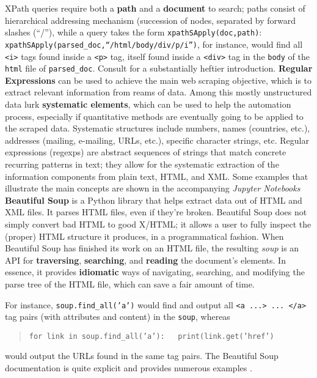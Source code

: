 XPath queries require both a \textbf{path} and a \textbf{document} to search; paths consist of hierarchical addressing mechanism (succession of nodes, separated by forward slashes (``/''), while a query takes the form \small\texttt{xpathSApply(doc,path)}\normalsize :\\
\footnotesize\texttt{xpathSApply(parsed\_doc,``/html/body/div/p/i'')}\normalsize, for instance, would find all \texttt{<i>} tags found inside a \texttt{<p>} tag, itself found inside a \texttt{<div>} tag in the \texttt{body} of the \texttt{html} file of \texttt{parsed\_doc}. Consult \cite{DC_MRMN} for a substantially heftier introduction. 
\newl\textbf{Regular Expressions} can be used to achieve the main web scraping objective, which is to extract  relevant information from reams of data. Among this mostly unstructured data lurk \textbf{systematic elements}, which can be used to help the automation process, especially if quantitative methods are eventually going to be applied to the scraped data. Systematic structures include numbers, names (countries, etc.), addresses (mailing, e-mailing, URLs, etc.), specific character strings, etc. Regular expressions (regexps) are abstract sequences of strings that match concrete recurring patterns in text; they allow for the systematic extraction of the information components from plain text, HTML, and XML. Some examples that illustrate the main concepts are shown in the accompanying \textit{Jupyter Notebooks} %
\newl\textbf{Beautiful Soup} is a Python library that helps extract data out of HTML and XML files. It parses HTML files, even if they're broken. Beautiful Soup does not simply convert bad HTML to good X/HTML; it allows a user to fully inspect the (proper) HTML structure it produces, in a programmatical fashion. When Beautiful Soup has finished its work on an HTML file, the resulting \textit{soup} is an API for \textbf{traversing}, \textbf{searching}, and \textbf{reading} the document's elements. In essence, it provides \textbf{idiomatic} ways of navigating, searching, and modifying the parse tree of the HTML file, which can save a fair amount of time.
\par For instance, \texttt{soup.find\_all('a')} would find and output all \texttt{<a ...> ... </a>} tag pairs (with attributes and content) in the \texttt{soup}, whereas \begin{quote}\texttt{for link in soup.find\_all('a'):}\newline \texttt{\ \ \ print(link.get('href')}
\end{quote} would output the URLs found in the same tag pairs. The Beautiful Soup documentation is quite explicit and provides numerous examples \cite{DC_BS}. 
